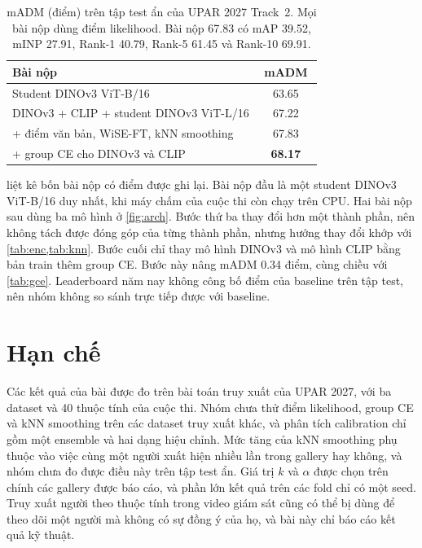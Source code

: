 \documentclass[10pt,twocolumn,letterpaper]{article}
\begin{document}
\begin{table}[t]
\centering
\small
\setlength{\tabcolsep}{4pt}
\begin{tabular}{@{}p{0.8\linewidth}c@{}}
\toprule
Bài nộp & mADM \\
\midrule
Student DINOv3 ViT-B/16 & 63.65 \\
DINOv3 + CLIP + student DINOv3 ViT-L/16 & 67.22 \\
\quad + điểm văn bản, WiSE-FT, kNN smoothing & 67.83 \\
\quad + group CE cho DINOv3 và CLIP & \textbf{68.17} \\
\bottomrule
\end{tabular}
\caption{mADM (điểm) trên tập test ẩn của UPAR 2027 Track~2. Mọi bài nộp dùng điểm likelihood. Bài nộp 67.83 có mAP 39.52, mINP 27.91, Rank-1 40.79, Rank-5 61.45 và Rank-10 69.91.}
\label{tab:test}
\end{table}

 liệt kê bốn bài nộp có điểm được ghi lại. Bài nộp đầu là một student DINOv3 ViT-B/16 duy nhất, khi máy chấm của cuộc thi còn chạy trên CPU. Hai bài nộp sau dùng ba mô hình ở \cref{fig:arch}. Bước thứ ba thay đổi hơn một thành phần, nên không tách được đóng góp của từng thành phần, nhưng hướng thay đổi khớp với \cref{tab:enc,tab:knn}. Bước cuối chỉ thay mô hình DINOv3 và mô hình CLIP bằng bản train thêm group CE. Bước này nâng mADM 0.34 điểm, cùng chiều với \cref{tab:gce}. Leaderboard năm nay không công bố điểm của baseline trên tập test, nên nhóm không so sánh trực tiếp được với baseline.

\section{Hạn chế}
\label{sec:limits}

Các kết quả của bài được đo trên bài toán truy xuất của UPAR 2027, với ba dataset và 40 thuộc tính của cuộc thi. Nhóm chưa thử điểm likelihood, group CE và kNN smoothing trên các dataset truy xuất khác, và phân tích calibration chỉ gồm một ensemble và hai dạng hiệu chỉnh. Mức tăng của kNN smoothing phụ thuộc vào việc cùng một người xuất hiện nhiều lần trong gallery hay không, và nhóm chưa đo được điều này trên tập test ẩn. Giá trị $k$ và $\alpha$ được chọn trên chính các gallery được báo cáo, và phần lớn kết quả trên các fold chỉ có một seed. Truy xuất người theo thuộc tính trong video giám sát cũng có thể bị dùng để theo dõi một người mà không có sự đồng ý của họ, và bài này chỉ báo cáo kết quả kỹ thuật.
\end{document}
